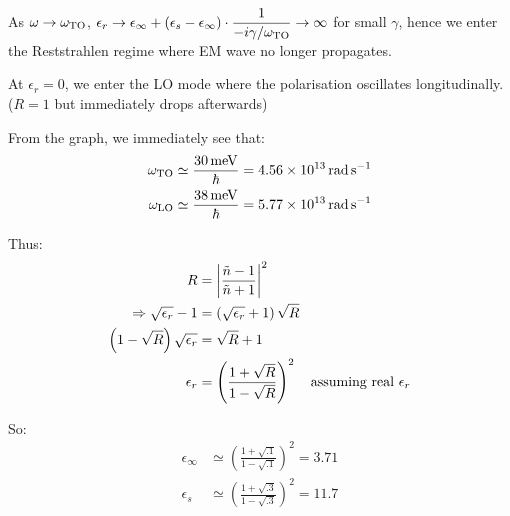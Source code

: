 \begin{parts}
	As $\omega \rightarrow \omega_\textnormal{TO}$, $\epsilon_r \rightarrow \epsilon_\infty + \left(\epsilon_s - \epsilon_\infty\right) \cdot \dfrac{1}{-i\gamma/\omega_\textnormal{TO}} \rightarrow \infty$ for small $\gamma$, hence we enter the Reststrahlen regime where EM wave no longer propagates.
	
	At $\epsilon_r = 0$, we enter the LO mode where the polarisation oscillates longitudinally. ($R = 1$ but immediately drops afterwards)
	
	From the graph, we immediately see that:
	\begin{align*}
		\omega_\textnormal{TO} &\simeq \frac{\SI{30}{\milli\electronvolt}}{\hbar} = \SI{4.56e13}{\radian\per\second} \\
		\omega_\textnormal{LO} &\simeq \frac{\SI{38}{\milli\electronvolt}}{\hbar} = \SI{5.77e13}{\radian\per\second}
	\end{align*}
	
	Thus:
	\begin{align*}
		R &= \left|\frac{\tilde{n} - 1}{\tilde{n} + 1}\right|^2 \\
		\Rightarrow \sqrt{\epsilon_r} - 1 &= \left(\sqrt{\epsilon_r} + 1\right) \sqrt{R} \\
		\left(1 - \sqrt{R}\right) \sqrt{\epsilon_r} &= \sqrt{R} + 1 \\
		\epsilon_r &= \left(\frac{1 + \sqrt{R}}{1 - \sqrt{R}}\right)^2 \textnormal{\hspace{1em}assuming real $\epsilon_r$}
	\end{align*}
	
	So:
	\begin{align*}
		\epsilon_\infty &\simeq \left(\frac{1 + \sqrt{\num{.1}}}{1 - \sqrt{\num{.1}}}\right)^2 = \num{3.71} \\
		\epsilon_s &\simeq \left(\frac{1 + \sqrt{\num{.3}}}{1 - \sqrt{\num{.3}}}\right)^2 = \num{11.7}
	\end{align*}
	

\end{parts}
